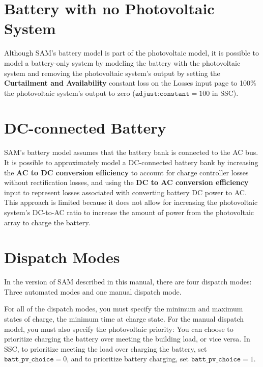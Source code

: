 \documentclass[12pt,letterpaper]{article}
\begin{document}
\section{Battery with no Photovoltaic System}\label{sec-batterymodel-nopv}
Although SAM's battery model is part of the photovoltaic model, it is possible to model a battery-only system by modeling the battery with the photovoltaic system and removing the photovoltaic system's output by setting the \textbf{Curtailment and Availability} constant loss on the Losses input page to 100\% the photovoltaic system's output to zero ($\texttt{adjust:constant}=100$ in SSC).

\section{DC-connected Battery}\label{sec-batterymodel-dc}
SAM's battery model assumes that the battery bank is connected to the AC bus. It is possible to approximately model a DC-connected battery bank by increasing the \textbf{AC to DC conversion efficiency} to account for charge controller losses without rectification losses, and using the \textbf{DC to AC conversion efficiency} input to represent losses associated with converting battery DC power to AC. This approach is limited because it does not allow for increasing the photovoltaic system's DC-to-AC ratio to increase the amount of power from the photovoltaic array to charge the battery.

\section{Dispatch Modes} \label{sec-batterymodel-dispatch}
In the version of SAM described in this manual, there are four dispatch modes: Three automated modes and one manual dispatch mode.

For all of the dispatch modes, you must specify the minimum and maximum states of charge, the minimum time at charge state. For the manual dispatch model, you must also specify the photovoltaic priority: You can choose to prioritize charging the battery over meeting the building load, or vice versa. In SSC, to prioritize meeting the load over charging the battery, set $\texttt{batt\_pv\_choice} = 0$, and to prioritize battery charging, set $\texttt{batt\_pv\_choice}= 1$.
\end{document}
